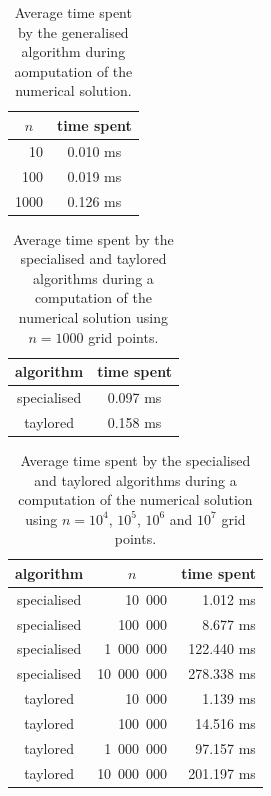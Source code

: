 \documentclass[reprint,english]{revtex4-1}
\begin{document}
\begin{table}[h!]
\caption{Average time spent by the generalised algorithm during aomputation of the numerical solution.}\label{tab:time_gen_alg}
\begin{tabular}{|r|c|}
\hline
\multicolumn{1}{|c|}{\(n\)} & time spent \\\hline
  10  & 0.010 ms \\\hline
 100  & 0.019 ms \\\hline
1000  & 0.126 ms \\\hline
\end{tabular}
\end{table}

\begin{table}[h!]
\caption{Average time spent by the specialised and taylored algorithms during a computation of the numerical solution using \(n=1000\) grid points.}\label{tab:time_spe_tay_alg}
\begin{tabular}{|c|c|}
\hline
algorithm & time spent \\\hline
specialised & 0.097 ms \\\hline
taylored    & 0.158 ms \\\hline
\end{tabular}
\end{table}

\begin{table}[h!]
\caption{Average time spent by the specialised and taylored algorithms during a computation of the numerical solution using \(n=10^4\), \(10^5\), \(10^6\) and \(10^7\)  grid points.}\label{tab:time_spe_tay_alg2}
\begin{tabular}{|c|r|r|}
\hline
algorithm   & \multicolumn{1}{c|}{\(n\)} & \multicolumn{1}{c|}{time spent} \\\hline
specialised &      10\ 000  &   1.012 ms   \\\hline
specialised &     100\ 000  &   8.677 ms   \\\hline
specialised &  1\ 000\ 000  & 122.440 ms   \\\hline
specialised & 10\ 000\ 000  & 278.338 ms   \\\hline
taylored    &      10\ 000  &   1.139 ms   \\\hline
taylored    &     100\ 000  &  14.516 ms   \\\hline
taylored    &  1\ 000\ 000  &  97.157 ms   \\\hline
taylored    & 10\ 000\ 000  & 201.197 ms   \\\hline
\end{tabular}
\end{table}
\end{document}
